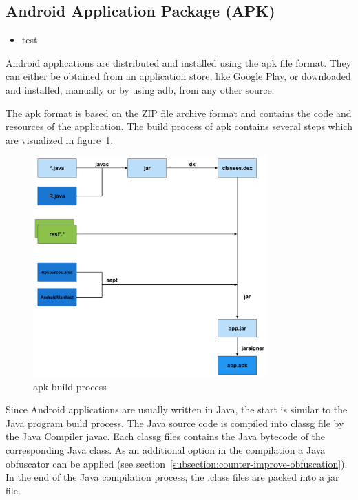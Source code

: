 \subsection{Android Application Package (APK)} \label{subsection:foundation-android-package}
\begin{itemize}
    \item test
\end{itemize}
Android applications are distributed and installed using the \gls{apk} file format.
They can either be obtained from an application store, like Google Play, or downloaded and installed, manually or by using \gls{adb}, from any other source.

The \gls{apk} format is based on the ZIP file archive format and contains the code and resources of the application.
The build process of \gls{apk} contains several steps which are visualized in figure~\ref{fig:apk}.
\newline
\begin{figure}[h]
    \centering
    \includegraphics[width=0.8\textwidth]{data/apk.png}
    \caption{\gls{apk} build process \cite{andevconDalvikART}}
    \label{fig:apk}
\end{figure}
Since Android applications are usually written in Java, the start is similar to the Java program build process.
The Java source code is compiled into \gls{classg} file by the Java Compiler javac.
Each \gls{classg} files contains the Java bytecode of the corresponding Java class.
As an additional option in the compilation a Java obfuscator can be applied (see section~\ref{subsection:counter-improve-obfuscation}).
In the end of the Java compilation process, the .class files are packed into a \gls{jar} file.
